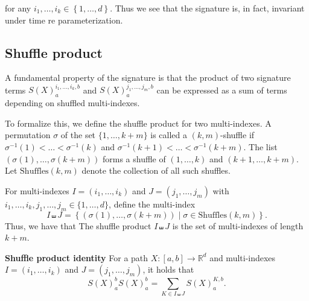 for any $i_{1},\ldots, i_{k} \in  \left\{ 1,\ldots,d \right\} $. Thus we see that the signature is, in fact, invariant under time re parameterization.

\subsection{Shuffle product}%
\label{sub:shuffle_product}


A fundamental property of the signature is that the product of two signature terms \( S(X)_a^{i_1,\dots,i_k,b} \) and \( S(X)_a^{j_1,\dots,j_m,b} \) can be expressed as a sum of terms depending on shuffled multi-indexes.

To formalize this, we define the shuffle product for two multi-indexes. A permutation \( \sigma \) of the set \( \{1, \dots, k+m\} \) is called a \((k,m)\)-shuffle if \( \sigma^{-1}(1) < \dots < \sigma^{-1}(k) \) and \( \sigma^{-1}(k+1) < \dots < \sigma^{-1}(k+m) \). The list \( (\sigma(1), \dots, \sigma(k+m)) \) forms a shuffle of \( (1, \dots, k) \) and \( (k+1, \dots, k+m) \). Let \( \text{Shuffles}(k,m) \) denote the collection of all such shuffles.

For multi-indexes \( I = (i_1, \dots, i_k) \) and \( J = (j_1, \dots, j_m) \) with \( i_1, \dots, i_k, j_1, \dots, j_m \in \{1, \dots, d\} \), define the multi-index
\[
 I \shuffle J =\left\{   (\sigma(1), \dots, \sigma(k+m)) \mid \sigma \in \text{Shuffles}(k,m) \right\} .
\]
Thus, we have that The shuffle product \( I \shuffle J \) is the set of multi-indexes of length \( k+m \).

\begin{theorem}
\textbf{Shuffle product identity} For a path \( X: [a,b] \to \mathbb{R}^d \) and multi-indexes \( I = (i_1, \dots, i_k) \) and \( J = (j_1, \dots, j_m) \), it holds that
\[
S(X)_a^b S(X)_a^b = \sum_{K \in I \shuffle J} S(X)_a^{K,b}.
\]
\end{theorem}
